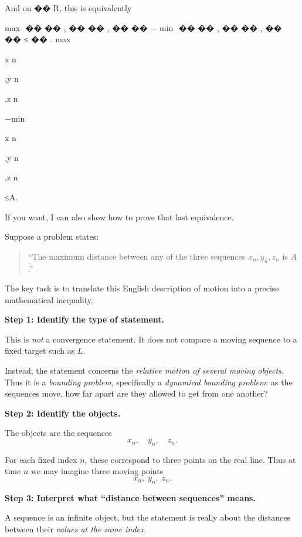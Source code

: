 And on 
��
R, this is equivalently

max
⁡
{
��
��
,
��
��
,
��
��
}
−
min
⁡
{
��
��
,
��
��
,
��
��
}
≤
��
.
max{x
n
	​

,y
n
	​

,z
n
	​

}−min{x
n
	​

,y
n
	​

,z
n
	​

}≤A.

If you want, I can also show how to prove that last equivalence.




\begin{remark*}

Suppose a problem states:

\begin{quote}
``The maximum distance between any of the three sequences
$x_n, y_n, z_n$ is $A$.'' 
\end{quote}

The key task is to translate this English description of motion into a
precise mathematical inequality.

\medskip

\textbf{Step 1: Identify the type of statement.}

This is \emph{not} a convergence statement.  
It does not compare a moving sequence to a fixed target such as $L$.

Instead, the statement concerns the \emph{relative motion of several
moving objects}.  Thus it is a \emph{bounding problem}, specifically a
\emph{dynamical bounding problem}: as the sequences move, how far apart
are they allowed to get from one another?

\medskip

\textbf{Step 2: Identify the objects.}

The objects are the sequences
\[
x_n, \quad y_n, \quad z_n .
\]

For each fixed index $n$, these correspond to three points on the real
line.  Thus at time $n$ we may imagine three moving points
\[
x_n, \; y_n, \; z_n .
\]

\medskip

\textbf{Step 3: Interpret what ``distance between sequences'' means.}

A sequence is an infinite object, but the statement is really about the
distances between their \emph{values at the same index}.  


\end{remark*}
